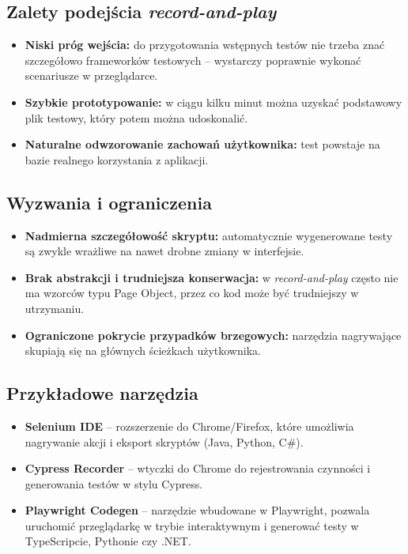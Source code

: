 \documentclass[12pt]{report}
\begin{document}
\subsection*{Zalety podejścia \emph{record-and-play}}
\begin{itemize}
    \item \textbf{Niski próg wejścia:} do przygotowania wstępnych testów nie trzeba znać szczegółowo frameworków testowych -- wystarczy poprawnie wykonać scenariusze w przeglądarce.
    \item \textbf{Szybkie prototypowanie:} w ciągu kilku minut można uzyskać podstawowy plik testowy, który potem można udoskonalić.
    \item \textbf{Naturalne odwzorowanie zachowań użytkownika:} test powstaje na bazie realnego korzystania z aplikacji.
\end{itemize}

\subsection*{Wyzwania i ograniczenia}
\begin{itemize}
    \item \textbf{Nadmierna szczegółowość skryptu:} automatycznie wygenerowane testy są zwykle wrażliwe na nawet drobne zmiany w interfejsie.
    \item \textbf{Brak abstrakcji i trudniejsza konserwacja:} w \emph{record-and-play} często nie ma wzorców typu Page Object, przez co kod może być trudniejszy w utrzymaniu.
    \item \textbf{Ograniczone pokrycie przypadków brzegowych:} narzędzia nagrywające skupiają się na głównych ścieżkach użytkownika.
\end{itemize}

\subsection*{Przykładowe narzędzia}
\begin{itemize}
    \item \textbf{Selenium IDE} -- rozszerzenie do Chrome/Firefox, które umożliwia nagrywanie akcji i eksport skryptów (Java, Python, C\#).
    \item \textbf{Cypress Recorder} -- wtyczki do Chrome do rejestrowania czynności i generowania testów w stylu Cypress.
    \item \textbf{Playwright Codegen} -- narzędzie wbudowane w Playwright, pozwala uruchomić przeglądarkę w trybie interaktywnym i generować testy w TypeScripcie, Pythonie czy .NET.
\end{itemize}
\end{document}
